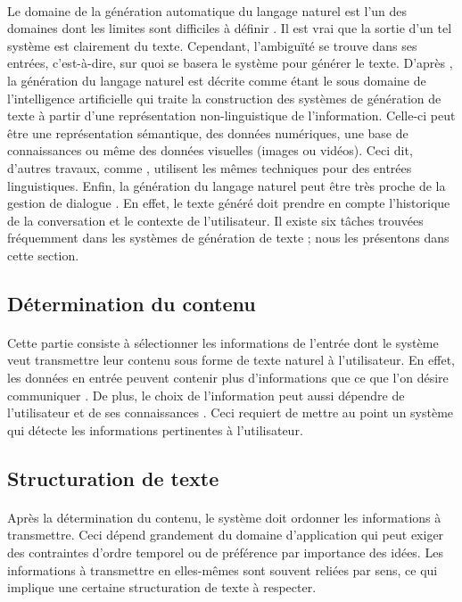 \paragraph{}
Le domaine de la génération automatique du langage naturel est l'un des domaines dont les limites sont difficiles à définir \citep{evans2002}. Il est vrai que la sortie d'un tel système est clairement du texte. Cependant, l'ambiguïté se trouve dans ses entrées, c'est-à-dire, sur quoi se basera le système pour générer le texte. D'après \citep{Reiter:1997}, la génération du langage naturel est décrite comme étant le sous domaine de l'intelligence artificielle qui traite la construction des systèmes de génération de texte à partir d'une représentation non-linguistique de l'information. Celle-ci peut être une représentation sémantique, des données numériques, une base de connaissances ou même des données visuelles (images ou vidéos). Ceci dit, d'autres travaux, comme \citep{Labbé2012}, utilisent les mêmes techniques pour des entrées linguistiques. Enfin, la génération du langage naturel peut être très proche de la gestion de dialogue \citep{Dethlefs2014}. En effet, le texte généré doit prendre en compte l'historique de la conversation et le contexte de l'utilisateur.\newline
Il existe six tâches trouvées fréquemment dans les systèmes de génération de texte \citep{Reiter:1997}; nous les présentons dans cette section.

\subsection{Détermination du contenu}
\paragraph{}
Cette partie consiste à sélectionner les informations de l'entrée dont le système veut transmettre leur contenu sous forme de texte naturel à l'utilisateur. En effet, les données en entrée peuvent contenir plus d'informations que ce que l'on désire communiquer \citep{Yu:2007}. De plus, le choix de l'information peut aussi dépendre de l'utilisateur et de ses connaissances \citep{Dethlefs2014}. Ceci requiert de mettre au point un système qui détecte les informations pertinentes à l'utilisateur.
\subsection{Structuration de texte}
\paragraph{}
Après la détermination du contenu, le système doit ordonner les informations à transmettre. Ceci dépend grandement du domaine d'application qui peut exiger des contraintes d'ordre temporel ou de préférence par importance des idées. Les informations à transmettre en elles-mêmes sont souvent reliées par sens, ce qui implique une certaine structuration de texte à respecter.
